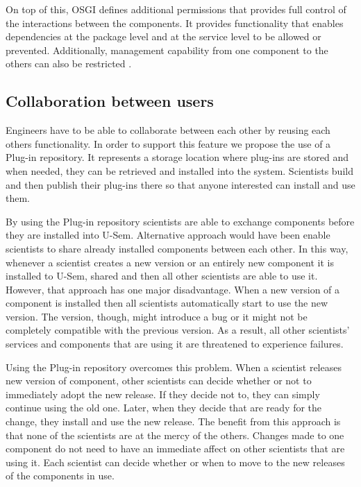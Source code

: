 On top of this, OSGI defines additional permissions that provides full control of the interactions between the components. It provides functionality that enables dependencies at the package level and at the service level to be allowed or prevented. Additionally, management capability from one component to the others can also be restricted \cite{Parrend}.

\subsection{Collaboration between users}

Engineers have to be able to collaborate between each other by reusing each others functionality. In order to support this feature we propose the use of a Plug-in repository. It represents a storage location where plug-ins are stored and when needed, they can be retrieved and installed into the system. Scientists build and then publish their plug-ins there so that anyone interested can install and use them. 

By using the Plug-in repository scientists are able to exchange components before they are installed into U-Sem. Alternative approach would have been enable scientists to share already installed components between each other. In this way, whenever a scientist creates a new version or an entirely new component it is installed to U-Sem, shared and then all other scientists are able to use it. However, that approach has one major disadvantage. When a new version of a component is installed then all scientists automatically start to use the new version. The version, though, might introduce a bug or it might not be completely compatible with the previous version. As a result, all other scientists' services and components that are using it are threatened to experience failures. 

Using the Plug-in repository overcomes this problem. When a scientist releases new version of component, other scientists can decide whether or not to immediately adopt the new release. If they decide not to, they can simply continue using the old one. 
Later, when they decide that are ready for the change, they install and use the new release. The benefit from this approach is that none of the scientists are at the mercy of the others. Changes made to one component do not need to have an immediate affect on other scientists that are using it. Each scientist can decide whether or when to move to the new releases of the components in use.


